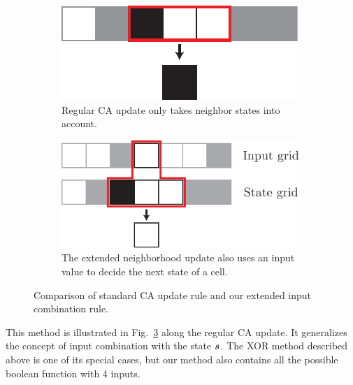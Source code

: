 \begin{figure}[htbp]
  \centering
    \begin{subfigure}[b]{.387\linewidth}
    \centering
    \includegraphics[width=\linewidth]{figures/ca_update_rule.pdf}
    \caption{Regular CA update only takes neighbor states into
      account.}\label{fig:standard-ca-update}
  \end{subfigure}
  \hspace{10pt}
  \begin{subfigure}[b]{.55\linewidth}
    \centering
    \includegraphics[width=\linewidth]{figures/generalized_ca_update_rule.pdf}
    \caption{The extended neighborhood update also uses an input value to
      decide the next state of a cell.}\label{fig:generalized-ca-update}
  \end{subfigure}
  \caption{Comparison of standard CA update rule and our extended input
    combination rule.\label{fig:ca_update_rule}}
\end{figure}

This method is illustrated in Fig.~\ref{fig:ca_update_rule} along the regular CA
update. It generalizes the concept of input combination with the state ${\bm{s}}$.
The XOR method described above is one of its special cases, but our method also
contains all the possible boolean function with 4 inputs.

